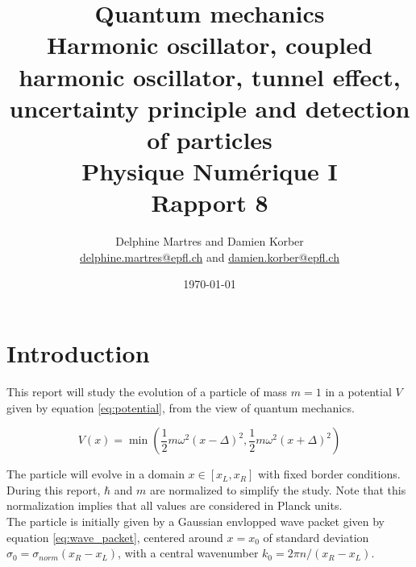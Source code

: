 \documentclass[a4paper,12pt,twoside]{article}
\newcommand{\mail}[1]{{\href{mailto:#1}{#1}}}
\newcommand{\bracket}[1]{\left(#1\right)}
\newcommand{\sqbracket}[1]{\left[#1\right]}
\begin{document}
\title{Quantum mechanics\\{\normalsize Harmonic oscillator, coupled harmonic oscillator, tunnel effect, uncertainty principle and detection of particles}\\{\small Physique Numérique I}\\{\small Rapport 8}}
\date{\today}
\author{Delphine Martres and Damien Korber\\{\small \mail{delphine.martres@epfl.ch} and \mail{damien.korber@epfl.ch}}}

\maketitle
\tableofcontents %


\baselineskip=16pt
\parindent=15pt
\parskip=5pt
\newpage


\section{Introduction}
  This report will study the evolution of a particle of mass $m=1$ in a potential $V$ given by equation \eqref{eq:potential}, from the view of quantum mechanics.

  \begin{equation}
    V(x) = \min\bracket{\frac{1}{2}m\omega^2(x-\Delta)^2, \frac{1}{2}m\omega^2(x+\Delta)^2}
    \label{eq:potential}
  \end{equation}

  The particle will evolve in a domain $x\in\sqbracket{x_L, x_R}$ with fixed border conditions.
  During this report, $\hbar$ and $m$ are normalized to simplify the study.
  Note that this normalization implies that all values are considered in Planck units.\\

  The particle is initially given by a Gaussian envlopped wave packet given by equation \eqref{eq:wave_packet}, centered around $x=x_0$ of standard deviation $\sigma_0 = \sigma_{norm}(x_R - x_L)$, with a central wavenumber $k_0 = 2\pi n/(x_R - x_L)$.
\end{document}
